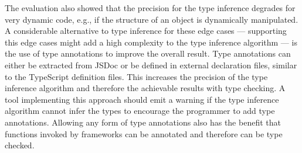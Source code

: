 The evaluation also showed that the precision for the type inference degrades for very dynamic code, e.g., if the structure of an object is dynamically manipulated. A considerable alternative to type inference for these edge cases --- supporting this edge cases might add a high complexity to the type inference algorithm --- is the use of type annotations to improve the overall result. Type annotations can either be extracted from JSDoc or be defined in external declaration files, similar to the TypeScript definition files. This increases the precision of the type inference algorithm and therefore the achievable results with type checking. A tool implementing this approach should emit a warning if the type inference algorithm cannot infer the types to encourage the programmer to add type annotations. Allowing any form of type annotations also has the benefit that functions invoked by frameworks can be annotated and therefore can be type checked.
